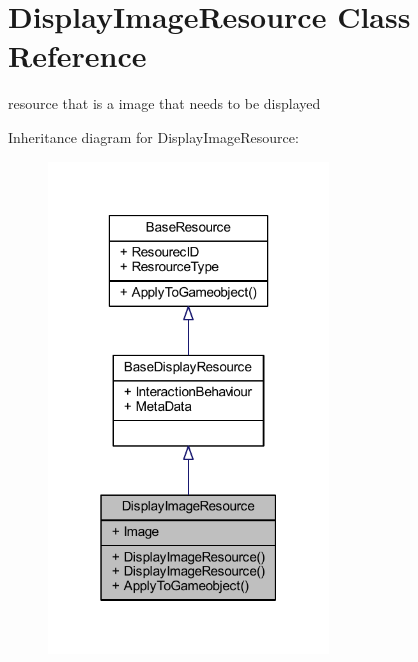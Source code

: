 \hypertarget{class_display_image_resource}{}\section{Display\+Image\+Resource Class Reference}
\label{class_display_image_resource}


resource that is a image that needs to be displayed  




Inheritance diagram for Display\+Image\+Resource\+:\nopagebreak
\begin{figure}[H]
\begin{center}
\leavevmode
\includegraphics[width=211pt]{class_display_image_resource__inherit__graph}
\end{center}
\end{figure}



